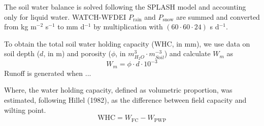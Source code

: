 \documentclass{myreport}
\begin{document}
The soil water balance is solved following the SPLASH model and accounting only for liquid water. WATCH-WFDEI $P_{\text{rain}}$ and $P_{\text{snow}}$ are summed and converted from kg m$^{-2}$ s$^{-1}$ to mm d$^{-1}$ by multiplication with $(60 \cdot 60 \cdot 24)$ s d$^{-1}$. 


To obtain the total soil water holding capacity (WHC, in mm), we use data on soil depth ($d$, in m) and porosity ($\phi$, in $m_{H_{2}O}^{3} \cdot m_{Soil}^{-3}$) and calculate $W_m$ as
\begin{equation}
    W_m = \phi \cdot d \cdot 10^{-3}
\end{equation}
Runoff is generated when ...


Where, the water holding capacity, defined as volumetric proportion, was estimated, following Hillel (1982), as the difference between field capacity and wilting point.
\begin{equation}
\text{WHC}=W_{\text{FC}}-W_{\text{PWP}}
\end{equation}
\end{document}
